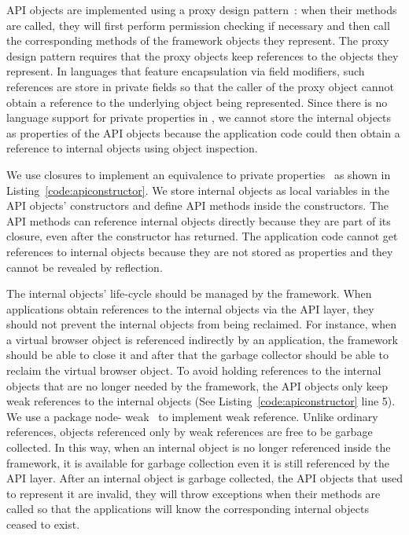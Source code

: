 API objects are implemented using a proxy design pattern~\cite{gamma1994design}:  
when their methods are
called, they will first perform permission checking if necessary and then call
the corresponding methods of the framework objects they represent. The proxy
design pattern requires that the proxy objects keep references to the objects they
represent. In languages that feature encapsulation via field modifiers, such 
references are store in private fields so
that the caller of the proxy object cannot obtain a reference to the 
underlying object being represented. Since there is no language support for private
properties in \js, we cannot  store the internal objects as properties of the
API objects because the application code could then obtain a reference to internal
objects using object inspection. 


We use closures to implement an equivalence to private properties~\cite{jsprivate} as
shown in Listing~\ref{code:apiconstructor}. We store internal objects as local
variables in the API objects' constructors and define API methods inside the
constructors. The API methods can reference internal objects
directly because they are part of its closure, even after the constructor has returned.
The application code cannot get references to internal objects because they 
are not stored as properties and they cannot be revealed by reflection.




The internal objects' life-cycle should be managed by the framework.
When applications obtain references to the internal objects via the API
layer, they should not prevent the internal objects from being reclaimed.
For instance, when a virtual browser object is referenced indirectly by
an application, the framework should be able to close it and after that
the garbage collector should be able to reclaim the virtual browser object.
To avoid holding references to the internal objects that are no longer needed
by the framework, the API objects only keep weak references to the internal
objects (See Listing~\ref{code:apiconstructor} line 5). We use a \nodejs{} package node-
weak~\cite{nodeweak} to implement weak reference. Unlike ordinary references,
objects referenced only by weak references are free to be garbage
collected.
In this way, when an internal object is no longer referenced
inside the framework, it is available for garbage collection even 
it is still referenced by the API layer.
After an internal object is garbage collected, the API objects that used to 
represent it are invalid, they
will throw exceptions when their methods are called so that
 the applications will know the corresponding internal objects ceased to exist.



